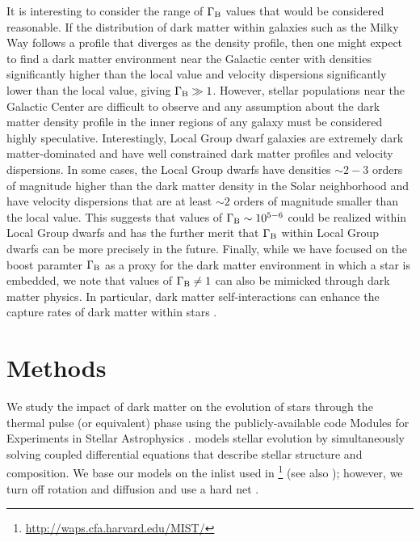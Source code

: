 \documentclass[useAMS,usenatbib]{mnras}
\begin{document}
It is interesting to consider the range of $\Gamma_\mathrm{B}$ values that would be considered reasonable. If the distribution of 
dark matter within galaxies such as the Milky Way follows a profile that diverges as the 
\citet[][NFW]{nfwprofile} density profile, then one might expect to find a dark matter environment near the Galactic center with
densities significantly higher than the local value and velocity dispersions significantly
lower than the local value, giving $\Gamma_\mathrm{B} \gg 1$.
However, stellar populations near the Galactic Center
are difficult to observe and any assumption about the dark matter density profile in the 
inner regions of any galaxy must be considered highly speculative. 
Interestingly, Local Group dwarf galaxies are extremely dark matter-dominated 
and have well constrained dark matter profiles and velocity dispersions. 
In some cases, the Local Group dwarfs have densities $\sim 2-3$ orders 
of magnitude higher than the dark matter density in the Solar neighborhood 
and have velocity dispersions that are at least $\sim 2$ orders of magnitude 
smaller than the local value. This suggests that values of $\Gamma_\mathrm{B} \sim 10^{5-6}$ 
could be realized within Local Group dwarfs and has the further merit that 
$\Gamma_\mathrm{B}$ within Local Group dwarfs can be  more precisely in the future. 
Finally, while we have focused on the boost paramter $\Gamma_\mathrm{B}$ as a proxy for 
the dark matter environment in which a star is embedded, we note that values 
of $\Gamma_\mathrm{B} \ne 1$ can also be mimicked through dark matter physics. 
In particular, 
dark matter self-interactions can enhance the capture rates of dark 
matter within stars \citep{Zentner2009High-energySun}.


\section{Methods}
\label{sec:methods}

  We study the impact of dark matter on the evolution of 
  \mrange stars through the thermal pulse (or equivalent) phase using the publicly-available code Modules for Experiments in Stellar Astrophysics \citep[\mesa,][]{Paxton2011ModulesMESA}. \mesa models stellar evolution by simultaneously solving coupled differential equations that describe stellar structure and composition. We base our models on the \mesa inlist used in \citet{Choi2016mesaModels}\footnote{\url{http://waps.cfa.harvard.edu/MIST/}} (see also \citealt{Dotter2016MesaIsochrones}); however, we turn off rotation and diffusion and use a hard net .
\end{document}
